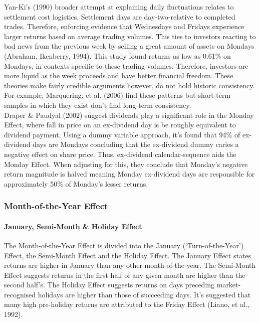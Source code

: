 \documentclass[11pt, english]{article}
\begin{document}
			Yan-Ki’s (1990) broader attempt at explaining daily fluctuations relates to settlement cost logistics. Settlement days are day-two-relative to completed trades. Therefore, enforcing evidence that Wednesdays and Fridays experience larger returns based on average trading volumes. This ties to investors reacting to bad news from the previous week by selling a great amount of assets on Mondays (Abraham, Ikenberry, 1994). This study found returns as low as 0.61\% on Mondays, in contexts specific to these trading volumes. Therefore, investors are more liquid as the week proceeds and have better financial freedom. These theories make fairly credible arguments however, do not hold historic consistency. For example, Marquering, et al. (2006) find these patterns but short-term samples in which they exist don’t find long-term consistency.\\

			Draper \& Paudyal (2002) suggest dividends play a significant role in the Monday Effect, where fall in price on an ex-dividend day is be roughly equivalent to dividend payment. Using a dummy variable approach, it’s found that 94\% of ex-dividend days are Mondays concluding that the ex-dividend dummy caries a negative effect on share price. Thus, ex-dividend calendar-sequence aids the Monday Effect. When adjusting for this, they conclude that Monday’s negative return magnitude is halved meaning Monday ex-dividend days are responsible for approximately 50\% of Monday’s lesser returns.

		\subsubsection{Month-of-the-Year Effect}

			\paragraph{January, Semi-Month \& Holiday Effect}
		
			The Month-of-the-Year Effect is divided into the January (`Turn-of-the-Year') Effect, the Semi-Month Effect and the Holiday Effect. The January Effect states returns are higher in January than any other month-of-the-year. The Semi-Month Effect suggests returns in the first half of any given month are higher than the second half’s. The Holiday Effect suggests returns on days preceding market-recognised holidays are higher than those of succeeding days. It’s suggested that many high pre-holiday returns are attributed to the Friday Effect (Liano, et al., 1992).
\end{document}
